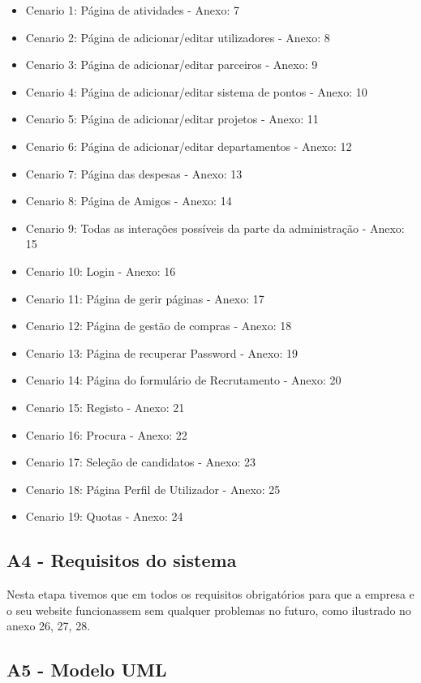 \documentclass[11pt]{report}
\begin{document}
\begin{itemize}
		\item Cenario 1: Página de atividades - Anexo: 7
		\item Cenario 2: Página de adicionar/editar utilizadores - Anexo: 8
		\item Cenario 3: Página de adicionar/editar parceiros - Anexo: 9
		\item Cenario 4: Página de adicionar/editar sistema de pontos - Anexo: 10
		\item Cenario 5: Página de adicionar/editar projetos - Anexo: 11
		\item Cenario 6: Página de adicionar/editar departamentos - Anexo: 12
		\item Cenario 7: Página das despesas - Anexo: 13
		\item Cenario 8: Página de Amigos - Anexo: 14
		\item Cenario 9: Todas as interações possíveis da parte da administração - Anexo: 15
		\item Cenario 10: Login - Anexo: 16	
		\item Cenario 11: Página de gerir páginas - Anexo: 17	
		\item Cenario 12: Página de gestão de compras - Anexo: 18
		\item Cenario 13: Página de recuperar Password - Anexo: 19	
		\item Cenario 14: Página do formulário de  Recrutamento - Anexo: 20	
		\item Cenario 15: Registo - Anexo: 21	
		\item Cenario 16: Procura - Anexo: 22	
		\item Cenario 17: Seleção de candidatos - Anexo: 23
		\item Cenario 18: Página Perfil de Utilizador - Anexo: 25
		\item Cenario 19: Quotas - Anexo: 24
\end{itemize}		
\subsection{A4 - Requisitos do sistema}
	
	
	Nesta etapa tivemos que em todos os requisitos obrigatórios para que a empresa e o seu website funcionassem sem qualquer problemas no futuro, como ilustrado no anexo 26, 27, 28.

\subsection{A5 - Modelo UML}
	
\end{document}
